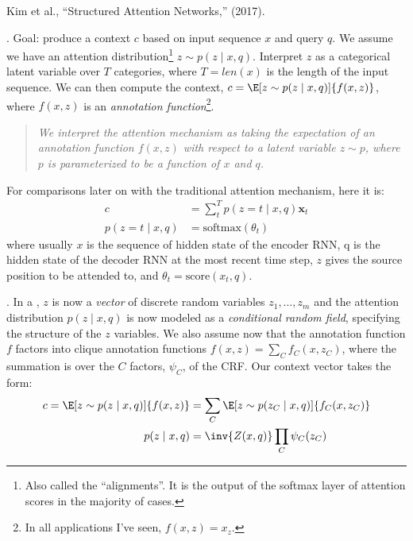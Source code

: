 \documentclass[11pt]{article}
\renewcommand\vec[2][]{\bm{#2}_{#1}}
\newcommand\myspace[1][]{\vspace{#1\bigskipamount}}
\newcommand\p{\Needspace{10\baselineskip} \noindent}
\begin{document}
\vspace{-1em}
{\footnotesize Kim et al., ``Structured Attention Networks,'' (2017).}

\p {}. Goal: produce a context $c$ based on input sequence $x$ and query $q$. We assume we have an attention distribution\footnote{Also called the ``alignments''. It is the output of the softmax layer of attention scores in the majority of cases.} $z \sim p(z \mid x, q)$. Interpret $z$ as a categorical latent variable over $T$ categories, where $T = len(x)$ is the length of the input sequence. We can then compute the context, $c = \E[z \sim p(z \mid x, q)]{f(x, z)}$, where $f(x, z)$ is an \textit{annotation function}\footnote{In all applications I've seen, $f(x, z) = x_z$.}. 
\vspace{-0.6em}
\begin{quote}
	{\small\itshape
		We interpret the attention mechanism as taking the expectation of an annotation function $f(x, z)$ with respect to a latent variable $z \sim p$, where $p$ is parameterized to be a function of $x$ and $q$.
	}
\end{quote}
For comparisons later on with the traditional attention mechanism, here it is:
\begin{align}
	c &= \sum_t^T p(z = t \mid x, q) \vec[t]{x} \label{eq:san-1} \\
	p(z = t \mid x, q) &= \text{softmax}(\theta_t) 
\end{align}
where usually $x$ is the sequence of hidden state of the encoder RNN, q is the hidden state of the decoder RNN at the most recent time step, $z$ gives the source position to be attended to, and $\theta_t = \text{score}(x_t, q)$.

\myspace
\p {}. In a , $z$ is now a \textit{vector} of discrete random variables $z_1, \ldots, z_m$ and the attention distribution $p(z \mid x, q)$ is now modeled as a \textit{conditional random field}, specifying the structure of the $z$ variables. We also assume now that the annotation function $f$ factors into clique annotation functions $f(x, z) = \sum_C f_C(x, z_C)$, where the summation is over the $C$ factors, $\psi_C$, of the CRF. Our context vector takes the form:
\begin{align}
	c = \E[z \sim p(z \mid x, q)]{f(x, z)} &= \sum_{C} \E[z \sim p(z_C \mid x, q)]{f_C(x, z_C)} \\
	p(z \mid x, q) &= \inv{Z(x, q)} \prod_C \psi_C(z_C) 
\end{align}
\end{document}
